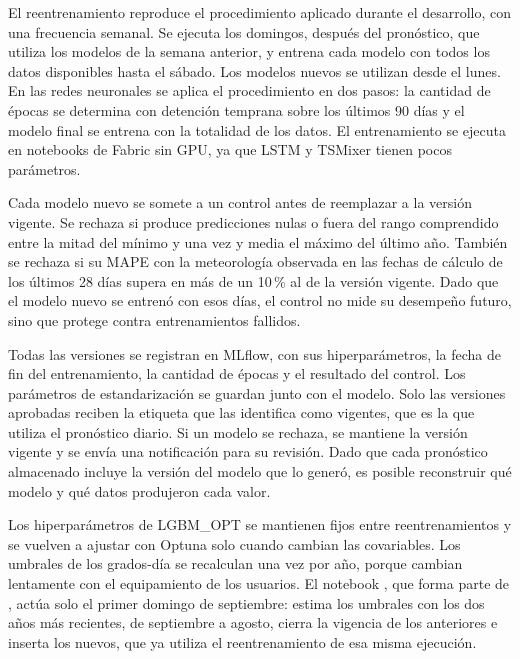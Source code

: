 El reentrenamiento reproduce el procedimiento aplicado durante el desarrollo, con una frecuencia semanal. Se ejecuta los domingos, después del pronóstico, que utiliza los modelos de la semana anterior, y entrena cada modelo con todos los datos disponibles hasta el sábado. Los modelos nuevos se utilizan desde el lunes. En las redes neuronales se aplica el procedimiento en dos pasos: la cantidad de épocas se determina con detención temprana sobre los últimos 90 días y el modelo final se entrena con la totalidad de los datos. El entrenamiento se ejecuta en notebooks de Fabric sin GPU, ya que LSTM y TSMixer tienen pocos parámetros.

Cada modelo nuevo se somete a un control antes de reemplazar a la versión vigente. Se rechaza si produce predicciones nulas o fuera del rango comprendido entre la mitad del mínimo y una vez y media el máximo del último año. También se rechaza si su MAPE con la meteorología observada en las fechas de cálculo de los últimos 28 días supera en más de un 10\,\% al de la versión vigente. Dado que el modelo nuevo se entrenó con esos días, el control no mide su desempeño futuro, sino que protege contra entrenamientos fallidos.

Todas las versiones se registran en MLflow, con sus hiperparámetros, la fecha de fin del entrenamiento, la cantidad de épocas y el resultado del control. Los parámetros de estandarización se guardan junto con el modelo. Solo las versiones aprobadas reciben la etiqueta que las identifica como vigentes, que es la que utiliza el pronóstico diario. Si un modelo se rechaza, se mantiene la versión vigente y se envía una notificación para su revisión. Dado que cada pronóstico almacenado incluye la versión del modelo que lo generó, es posible reconstruir qué modelo y qué datos produjeron cada valor.

Los hiperparámetros de LGBM\_OPT se mantienen fijos entre reentrenamientos y se vuelven a ajustar con Optuna solo cuando cambian las covariables. Los umbrales de los grados-día se recalculan una vez por año, porque cambian lentamente con el equipamiento de los usuarios. El notebook , que forma parte de , actúa solo el primer domingo de septiembre: estima los umbrales con los dos años más recientes, de septiembre a agosto, cierra la vigencia de los anteriores e inserta los nuevos, que ya utiliza el reentrenamiento de esa misma ejecución.

